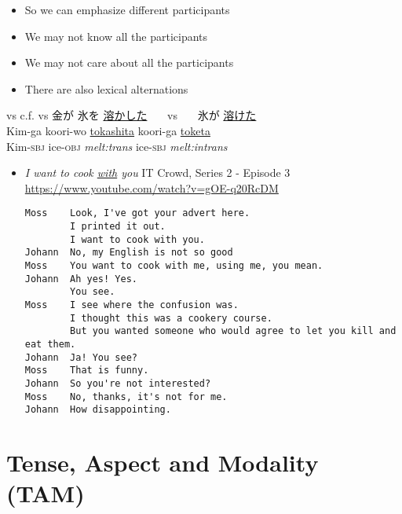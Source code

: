 \documentclass[a4paper,landscape,headrule,footrule,xetex]{foils}
\begin{document}
\begin{itemize}
\item So we can emphasize different participants
\item We may not know all the participants
\item We may not care about all the participants
\item There are also lexical alternations
\end{itemize}
\begin{exe}
\ex {} vs 
\ex c.f.  vs 
\ex \glll 金が 氷を \ul{溶かした}  {~~~vs~~~}  氷が \ul{溶けた} \\ 
Kim-ga koori-wo \ul{tokashita}  {} koori-ga \ul{toketa} \\
  Kim-\textsc{sbj} ice-\textsc{obj} \textit{melt:trans} 
{} ice-\textsc{sbj} \textit{melt:intrans} \\
\end{exe}



\begin{itemize}
\item \textit{I want to cook \ul{with} you}  IT Crowd, Series 2 - Episode 3
\\ \url{https://www.youtube.com/watch?v=gOE-q20RcDM}
\begin{verbatim}
Moss    Look, I've got your advert here.
        I printed it out.
        I want to cook with you.
Johann  No, my English is not so good 
Moss    You want to cook with me, using me, you mean.
Johann  Ah yes! Yes.
        You see.
Moss    I see where the confusion was.
        I thought this was a cookery course.
        But you wanted someone who would agree to let you kill and eat them.
Johann  Ja! You see? 
Moss    That is funny.
Johann  So you're not interested? 
Moss    No, thanks, it's not for me.
Johann  How disappointing.
\end{verbatim}
\end{itemize}


\section{Tense, Aspect and Modality (TAM)}
\end{document}
